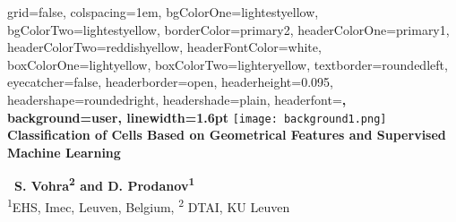 \documentclass[portrait,final,a0paper]{baposter}
\begin{document}
\newlength{\leftimgwidth}
\begin{poster}%
  {
  grid=false,
  colspacing=1em,
  bgColorOne=lightestyellow,
  bgColorTwo=lightestyellow,
  borderColor=primary2,
  headerColorOne=primary1,
  headerColorTwo=reddishyellow,
  headerFontColor=white,
  boxColorOne=lightyellow,
  boxColorTwo=lighteryellow,
  textborder=roundedleft,
  eyecatcher=false,
  headerborder=open,
  headerheight=0.095\textheight,
  headershape=roundedright,
  headershade=plain,
  headerfont=\Large\sf\bf, %
  background=user,
  linewidth=1.6pt
  }
  {\texttt{[image: background1.png]}} %
  {
  \vspace{2.2em}
  \color{primary1}
  \textbf{
  Classification of Cells Based on Geometrical Features and Supervised Machine Learning}
  }
  {
  \vspace{0.5em}\textbf{\ S. Vohra\textsuperscript{2} and D. Prodanov\textsuperscript{1}}\\
   \textsuperscript{1}EHS, Imec, Leuven, Belgium, \textsuperscript{2} DTAI, KU Leuven\\
   \vspace{1.94em}
    
  }
  {%
  }
   
    
 

\end{poster}
\end{document}
